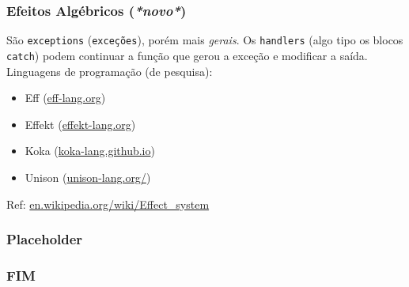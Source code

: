 \documentclass{beamer}
\begin{document}
\begin{frame}
    \frametitle{Efeitos Algébricos (\emph{*novo*})}
    São \texttt{exceptions} (\texttt{exceções}),
    porém mais \emph{gerais}.
    \vfill
    Os \texttt{handlers} (algo tipo os blocos \texttt{catch})
    podem continuar a função que gerou a exceção e
    modificar a saída.
    \vfill
    Linguagens de programação (de pesquisa):
    \begin{itemize}
        \item Eff (\url{eff-lang.org})
        \item Effekt (\url{effekt-lang.org})
        \item Koka (\url{koka-lang.github.io})
        \item Unison (\url{unison-lang.org/})
    \end{itemize}
    \vfill
    Ref: \url{en.wikipedia.org/wiki/Effect_system}
\end{frame}

\begin{frame}
    \frametitle{Placeholder}
\end{frame}

\begin{frame}
    \frametitle{FIM}
\end{frame}
\end{document}
